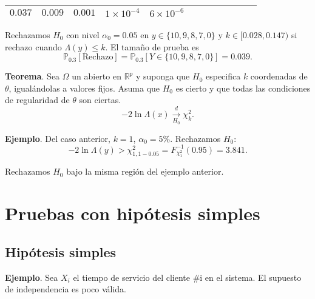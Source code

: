 \documentclass[
  12pt,
]{book}
\begin{document}
\begin{longtable}[]{@{}llllllllllll@{}}
\begin{minipage}[t]{0.06\columnwidth}
\(0.037\)\strut
\end{minipage} & \begin{minipage}[t]{0.06\columnwidth}\raggedright
\(0.009\)\strut
\end{minipage} & \begin{minipage}[t]{0.06\columnwidth}\raggedright
\(0.001\)\strut
\end{minipage} & \begin{minipage}[t]{0.05\columnwidth}\raggedright
\(1\times 10^{-4}\)\strut
\end{minipage} & \begin{minipage}[t]{0.05\columnwidth}\raggedright
\(6\times10^{-6}\)\strut
\end{minipage}\tabularnewline
\bottomrule
\end{longtable}

Rechazamos \(H_0\) con nivel \(\alpha_0 = 0.05\) en \(y \in\{10,9,8,7,0\}\) y \(k\in [0.028,0.147)\) si rechazo cuando \(\Lambda(y)\leq k\). El tamaño de prueba es
\[\mathbb P_{0.3}[\text{Rechazo}] = \mathbb{P}_{0.3}[Y\in \{10,9,8,7,0\}] = 0.039.\]

\textbf{Teorema}. Sea \(\Omega\) un abierto en \(\mathbb R^p\) y suponga que \(H_0\) especifica \(k\) coordenadas de \(\theta\), igualándolas a valores fijos. Asuma que \(H_0\) es cierto y que todas las condiciones de regularidad de \(\theta\) son ciertas.
\[-2\ln\Lambda(x)\xrightarrow[H_0]{d}\chi^2_k.\]

\textbf{Ejemplo}. Del caso anterior, \(k=1\), \(\alpha_0 = 5\%\). Rechazamos \(H_0\):
\[-2\ln \Lambda(y)>\chi^2_{1,1-0.05} = F^{-1}_{\chi^2_1}(0.95) = 3.841.\]

Rechazamos \(H_0\) bajo la misma región del ejemplo anterior.

\hypertarget{pruebas-con-hipuxf3tesis-simples}{%
\chapter{Pruebas con hipótesis simples}\label{pruebas-con-hipuxf3tesis-simples}}

\hypertarget{hipuxf3tesis-simples}{%
\section{Hipótesis simples}\label{hipuxf3tesis-simples}}

\textbf{Ejemplo}. Sea \(X_i\) el tiempo de servicio del cliente \#i en el sistema. El supuesto de independencia es poco válida.
\end{document}
